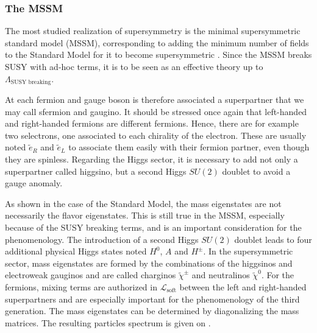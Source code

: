         \subsubsection{The MSSM}

        The most studied realization of supersymmetry is the minimal supersymmetric standard
        model (MSSM), corresponding to adding the minimum number of fields to the Standard
        Model for it to become supersymmetric \cite{Dawson, Vempati, Romao}.
        Since the MSSM breaks SUSY with ad-hoc terms, it is to be seen as an effective
        theory up to $\Lambda_{\text{SUSY breaking}}$.

        At each fermion and gauge boson is therefore associated a superpartner that we may
        call sfermion and gaugino. It should be
        stressed once again that left-handed and right-handed fermions are different
        fermions. Hence, there are for example two selectrons, one associated to
        each chirality of the electron. These are usually noted $\tilde{e}_R$ and $\tilde{e}_L$
        to associate them easily with their fermion partner, even though they are spinless.
        Regarding the Higgs sector, it is necessary to add not only a superpartner called
        higgsino, but a second Higgs $SU(2)$ doublet to avoid a gauge anomaly.

        As shown in the case of the Standard Model, the mass eigenstates are not
        necessarily the flavor eigenstates. This is still true in the MSSM, especially
        because of the SUSY breaking terms, and is an important consideration for the
        phenomenology. The introduction of a second Higgs $SU(2)$ doublet leads to four
        additional physical Higgs states noted $H^0$, $A$ and $H^\pm$.
        In the supersymmetric sector, mass eigenstates are formed by the combinations of
        the higgsinos and electroweak gauginos and are called charginos $\tilde{\chi}^\pm$
        and neutralinos $\tilde{\chi}^0$.
        For the fermions, mixing terms are authorized in $\mathcal{L}_\text{soft}$ between
        the left and right-handed superpartners and are especially important for the
        phenomenology of the third generation. The mass eigenstates can be determined
        by diagonalizing the mass matrices. The resulting particles spectrum is given on
        .

